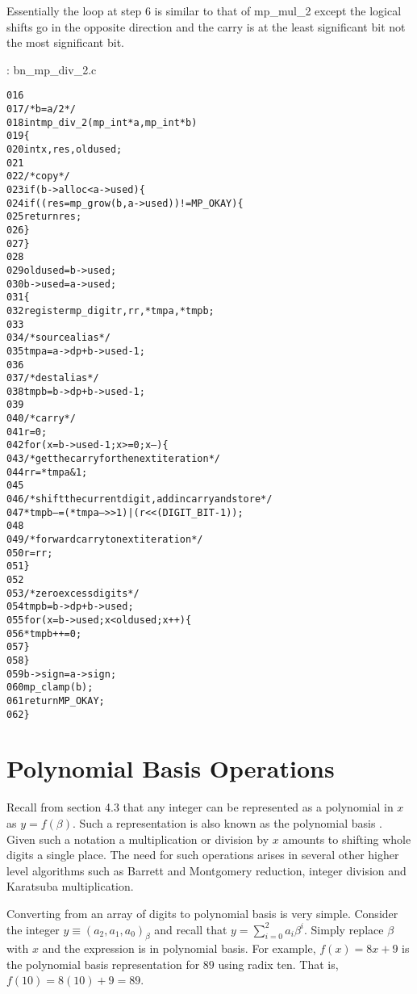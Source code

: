 \documentclass[b5paper]{book}
\begin{document}
Essentially the loop at step 6 is similar to that of mp\_mul\_2 except the logical shifts go in the opposite direction and the carry is at the 
least significant bit not the most significant bit.  

\vspace{+3mm}\begin{small}
\hspace{-5.1mm}{\bf File}: bn\_mp\_div\_2.c
\vspace{-3mm}
\begin{alltt}
016   
017   /* b = a/2 */
018   int mp_div_2(mp_int * a, mp_int * b)
019   \{
020     int     x, res, oldused;
021   
022     /* copy */
023     if (b->alloc < a->used) \{
024       if ((res = mp_grow (b, a->used)) != MP_OKAY) \{
025         return res;
026       \}
027     \}
028   
029     oldused = b->used;
030     b->used = a->used;
031     \{
032       register mp_digit r, rr, *tmpa, *tmpb;
033   
034       /* source alias */
035       tmpa = a->dp + b->used - 1;
036   
037       /* dest alias */
038       tmpb = b->dp + b->used - 1;
039   
040       /* carry */
041       r = 0;
042       for (x = b->used - 1; x >= 0; x--) \{
043         /* get the carry for the next iteration */
044         rr = *tmpa & 1;
045   
046         /* shift the current digit, add in carry and store */
047         *tmpb-- = (*tmpa-- >> 1) | (r << (DIGIT_BIT - 1));
048   
049         /* forward carry to next iteration */
050         r = rr;
051       \}
052   
053       /* zero excess digits */
054       tmpb = b->dp + b->used;
055       for (x = b->used; x < oldused; x++) \{
056         *tmpb++ = 0;
057       \}
058     \}
059     b->sign = a->sign;
060     mp_clamp (b);
061     return MP_OKAY;
062   \}
\end{alltt}
\end{small}

\section{Polynomial Basis Operations}
Recall from section 4.3 that any integer can be represented as a polynomial in $x$ as $y = f(\beta)$.  Such a representation is also known as
the polynomial basis \cite[pp. 48]{ROSE}. Given such a notation a multiplication or division by $x$ amounts to shifting whole digits a single 
place.  The need for such operations arises in several other higher level algorithms such as Barrett and Montgomery reduction, integer
division and Karatsuba multiplication.  

Converting from an array of digits to polynomial basis is very simple.  Consider the integer $y \equiv (a_2, a_1, a_0)_{\beta}$ and recall that
$y = \sum_{i=0}^{2} a_i \beta^i$.  Simply replace $\beta$ with $x$ and the expression is in polynomial basis.  For example, $f(x) = 8x + 9$ is the
polynomial basis representation for $89$ using radix ten.  That is, $f(10) = 8(10) + 9 = 89$.  
\end{document}
